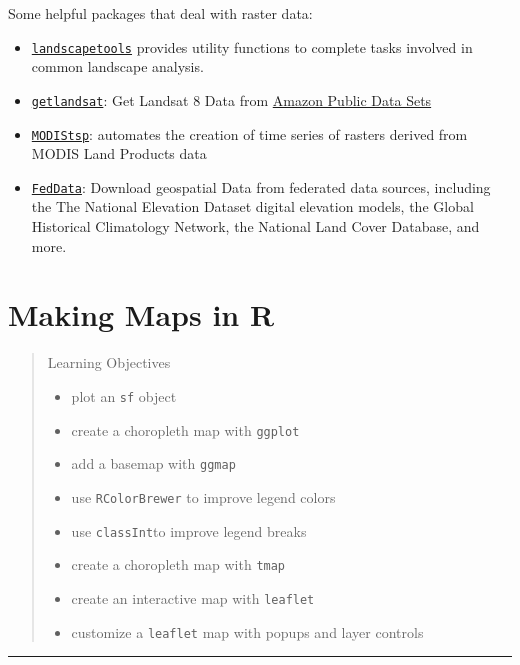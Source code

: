 \documentclass[]{book}
\providecommand{\tightlist}{%
  \setlength{\itemsep}{0pt}\setlength{\parskip}{0pt}}
\begin{document}
Some helpful packages that deal with raster data:

\begin{itemize}
\tightlist
\item
  \href{https://CRAN.R-project.org/package=landscapetools}{\texttt{landscapetools}}
  provides utility functions to complete tasks involved in common
  landscape analysis.
\item
  \href{https://CRAN.R-project.org/package=getlandsat}{\texttt{getlandsat}}:
  Get Landsat 8 Data from
  \href{https://registry.opendata.aws/landsat-8/}{Amazon Public Data
  Sets}
\item
  \href{https://CRAN.R-project.org/package=MODIStsp}{\texttt{MODIStsp}}:
  automates the creation of time series of rasters derived from MODIS
  Land Products data
\item
  \href{https://cran.r-project.org/package=FedData}{\texttt{FedData}}:
  Download geospatial Data from federated data sources, including the
  The National Elevation Dataset digital elevation models, the Global
  Historical Climatology Network, the National Land Cover Database, and
  more.
\end{itemize}

\chapter{Making Maps in R}\label{mapping}

\begin{quote}
Learning Objectives

\begin{itemize}
\tightlist
\item
  plot an \texttt{sf} object
\item
  create a choropleth map with \texttt{ggplot}
\item
  add a basemap with \texttt{ggmap}
\item
  use \texttt{RColorBrewer} to improve legend colors
\item
  use \texttt{classInt}to improve legend breaks
\item
  create a choropleth map with \texttt{tmap}
\item
  create an interactive map with \texttt{leaflet}
\item
  customize a \texttt{leaflet} map with popups and layer controls
\end{itemize}
\end{quote}

\begin{center}\rule{0.5\linewidth}{\linethickness}\end{center}
\end{document}
